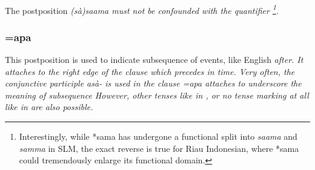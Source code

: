 \\
% 
% 
%  


The postposition \em (sà)saama \em must not be confounded with the quantifier \footnote{Interestingly, while *sama has undergone a functional split into \textit{saama} and \textit{samma} in SLM, the exact reverse is true for Riau Indonesian, where *sama could tremendously enlarge its functional domain\citep{Gil2004sama}.}.


\subsubsection{=apa}\label{sec:morph:=apa}
This postposition is used to indicate subsequence of events, like English \em after\em.  It attaches to the right edge of the clause which precedes in time. Very often, the conjunctive participle \em asà- \em is used in the clause \em =apa \em attaches to underscore the meaning of subsequence  However, other tenses like in , or no tense marking at all like in  are also possible.

